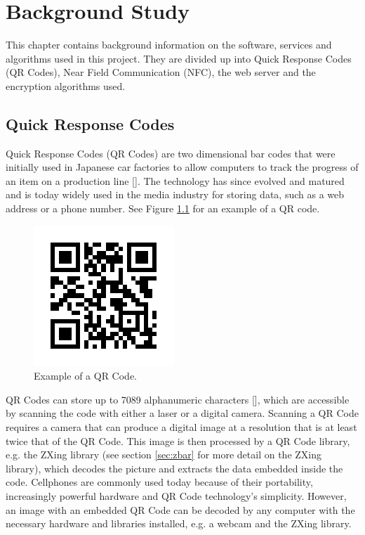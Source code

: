 \chapter{Background Study}
\label{chap:2}

This chapter contains background information on the software, services and algorithms used
in this project. They are divided up into Quick Response Codes (QR Codes), Near Field
Communication (NFC), the web server and the encryption algorithms used.

\section{Quick Response Codes}

 Quick Response Codes (QR Codes) are two dimensional bar codes that were initially
 used in Japanese car factories to allow computers to track the progress of
 an item on a production line [\cite{journal:qr-code}]. The technology has
 since evolved and matured and is today widely used in the media industry for storing
 data, such as a web address or a phone number. See Figure \ref{qrcode} for an example of
 a QR code.
 
\begin{figure}
\centering
\includegraphics[scale = 0.7]{qrcode_voorbeeld.png}
\caption{Example of a QR Code.}
\label{qrcode}
\end{figure}
 
 QR Codes can store up to 7089 alphanumeric characters [\cite{journal:qr-code}], which are
 accessible by scanning the code with either a laser or a digital camera.
 Scanning a QR Code requires a camera that can produce a digital image at a
 resolution that is at least twice that of the QR Code.
 This image is then processed by a QR Code library, e.g.
 the ZXing library (see section \ref{sec:zbar} for more detail on the ZXing library),
 which decodes the picture and extracts the data embedded inside the code. Cellphones are
 commonly used today because of their portability, increasingly powerful hardware and QR
 Code technology's simplicity.
 However, an image with an embedded QR Code can be decoded by any computer with the
 necessary hardware and libraries installed, e.g. a webcam and the ZXing
 library.

